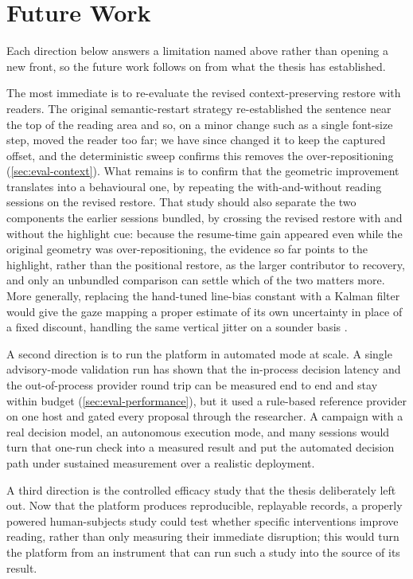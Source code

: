 \section{Future Work}
\label{sec:disc-future-work}

Each direction below answers a limitation named above rather than opening a new front, so the future work follows on from what the thesis has established.

The most immediate is to re-evaluate the revised context-preserving restore with readers.
The original semantic-restart strategy re-established the sentence near the top of the reading area and so, on a minor change such as a single font-size step, moved the reader too far; we have since changed it to keep the captured offset, and the deterministic sweep confirms this removes the over-repositioning (\cref{sec:eval-context}).
What remains is to confirm that the geometric improvement translates into a behavioural one, by repeating the with-and-without reading sessions on the revised restore.
That study should also separate the two components the earlier sessions bundled, by crossing the revised restore with and without the highlight cue: because the resume-time gain appeared even while the original geometry was over-repositioning, the evidence so far points to the highlight, rather than the positional restore, as the larger contributor to recovery, and only an unbundled comparison can settle which of the two matters more.
More generally, replacing the hand-tuned line-bias constant with a Kalman filter would give the gaze mapping a proper estimate of its own uncertainty in place of a fixed discount, handling the same vertical jitter on a sounder basis \cite{kalman1960filtering}.

A second direction is to run the platform in automated mode at scale.
A single advisory-mode validation run has shown that the in-process decision latency and the out-of-process provider round trip can be measured end to end and stay within budget (\cref{sec:eval-performance}), but it used a rule-based reference provider on one host and gated every proposal through the researcher.
A campaign with a real decision model, an autonomous execution mode, and many sessions would turn that one-run check into a measured result and put the automated decision path under sustained measurement over a realistic deployment.

A third direction is the controlled efficacy study that the thesis deliberately left out.
Now that the platform produces reproducible, replayable records, a properly powered human-subjects study could test whether specific interventions improve reading, rather than only measuring their immediate disruption; this would turn the platform from an instrument that can run such a study into the source of its result.

